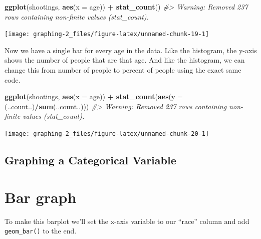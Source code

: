 \documentclass[
  12pt,
]{book}
\newenvironment{Shaded}{\begin{snugshade}}{\end{snugshade}}
\newcommand{\CommentTok}[1]{\textcolor[rgb]{0.56,0.35,0.01}{\textit{#1}}}
\newcommand{\DataTypeTok}[1]{\textcolor[rgb]{0.13,0.29,0.53}{#1}}
\newcommand{\KeywordTok}[1]{\textcolor[rgb]{0.13,0.29,0.53}{\textbf{#1}}}
\newcommand{\NormalTok}[1]{#1}
\newcommand{\OperatorTok}[1]{\textcolor[rgb]{0.81,0.36,0.00}{\textbf{#1}}}
\newcommand{\StringTok}[1]{\textcolor[rgb]{0.31,0.60,0.02}{#1}}
\begin{document}
\begin{Shaded}
\begin{Highlighting}[]
\KeywordTok{ggplot}\NormalTok{(shootings, }\KeywordTok{aes}\NormalTok{(}\DataTypeTok{x =}\NormalTok{ age)) }\OperatorTok{+}\StringTok{ }
\StringTok{  }\KeywordTok{stat\_count}\NormalTok{()}
\CommentTok{\#> Warning: Removed 237 rows containing non{-}finite values (stat\_count).}
\end{Highlighting}
\end{Shaded}

\begin{center}\texttt{[image: graphing-2\_files/figure-latex/unnamed-chunk-19-1]} \end{center}

Now we have a single bar for every age in the data. Like the histogram, the y-axis shows the number of people that are that age. And like the histogram, we can change this from number of people to percent of people using the exact same code.

\begin{Shaded}
\begin{Highlighting}[]
\KeywordTok{ggplot}\NormalTok{(shootings, }\KeywordTok{aes}\NormalTok{(}\DataTypeTok{x =}\NormalTok{ age)) }\OperatorTok{+}\StringTok{ }
\StringTok{  }\KeywordTok{stat\_count}\NormalTok{(}\KeywordTok{aes}\NormalTok{(}\DataTypeTok{y =}\NormalTok{ (..count..)}\OperatorTok{/}\KeywordTok{sum}\NormalTok{(..count..)))}
\CommentTok{\#> Warning: Removed 237 rows containing non{-}finite values (stat\_count).}
\end{Highlighting}
\end{Shaded}

\begin{center}\texttt{[image: graphing-2\_files/figure-latex/unnamed-chunk-20-1]} \end{center}

\hypertarget{graphing-a-categorical-variable}{%
\subsection{Graphing a Categorical Variable}\label{graphing-a-categorical-variable}}

\hypertarget{bar-graph}{%
\section{Bar graph}\label{bar-graph}}

To make this barplot we'll set the x-axis variable to our ``race'' column and add \texttt{geom\_bar()} to the end.
\end{document}

